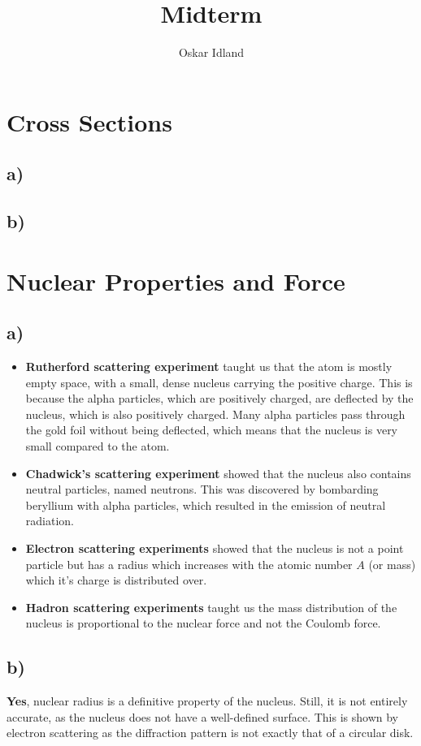 \documentclass{article}
\author{Oskar Idland}
\title{Midterm}
\date{}
\begin{document}
\maketitle
\newpage

\section{Cross Sections}
\subsection*{a)}


\subsection*{b)}


\section{Nuclear Properties and Force}
\subsection*{a)}
\begin{itemize}
    \item \textbf{Rutherford scattering experiment} taught us that the atom is mostly empty space, with a small, dense nucleus carrying the positive charge. This is because the alpha particles, which are positively charged, are deflected by the nucleus, which is also positively charged. Many alpha particles pass through the gold foil without being deflected, which means that the nucleus is very small compared to the atom.
    \item \textbf{Chadwick's scattering experiment} showed that the nucleus also contains neutral particles, named neutrons. This was discovered by bombarding beryllium with alpha particles, which resulted in the emission of neutral radiation.
    \item \textbf{Electron scattering experiments} showed that the nucleus is not a point particle but has a radius which increases with the atomic number $A$ (or mass) which it's charge is distributed over.
    \item \textbf{Hadron scattering experiments} taught us the mass distribution of the nucleus is proportional to the nuclear force and not the Coulomb force.
\end{itemize}


\subsection*{b)}
\textbf{Yes}, nuclear radius is a definitive property of the nucleus. Still, it is not entirely accurate, as the nucleus does not have a well-defined surface. This is shown by electron scattering as the diffraction pattern is not exactly that of a circular disk.
\end{document}
